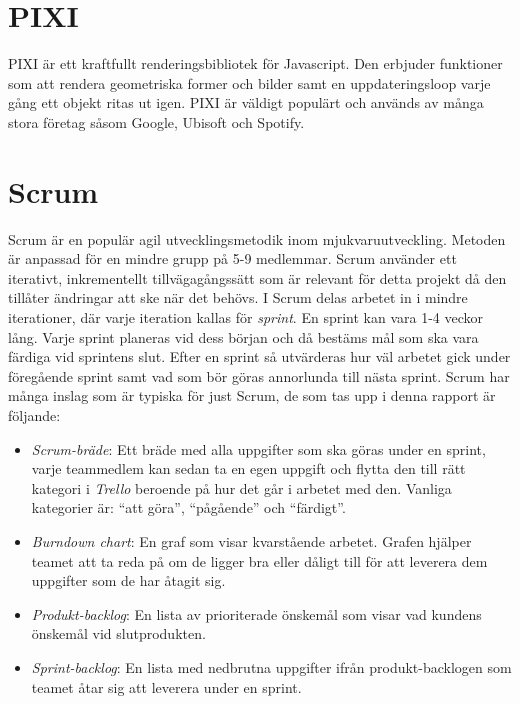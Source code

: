 \section{PIXI}
PIXI är ett kraftfullt renderingsbibliotek för Javascript.\cite{Pixi} Den erbjuder funktioner som att rendera geometriska former och bilder samt en uppdateringsloop varje gång ett objekt ritas ut igen. PIXI är väldigt populärt och används av många stora företag såsom Google, Ubisoft och Spotify. 

\section{Scrum}
Scrum är en populär agil utvecklingsmetodik inom mjukvaruutveckling. Metoden är anpassad för en mindre grupp på 5-9 medlemmar. Scrum använder ett iterativt, inkrementellt tillvägagångssätt som är relevant för detta projekt då den tillåter ändringar att ske när det behövs.\cite{TheScrum} I Scrum delas arbetet in i mindre iterationer, där varje iteration kallas för \textit{sprint}. En sprint kan vara 1-4 veckor lång. Varje sprint planeras vid dess början och då bestäms mål som ska vara färdiga vid sprintens slut. Efter en sprint så utvärderas hur väl arbetet gick under föregående sprint samt vad som bör göras annorlunda till nästa sprint. Scrum har många inslag som är typiska för just Scrum, de som tas upp i denna rapport är följande:

\begin{itemize}
	\item \textit{Scrum-bräde}: Ett bräde med alla uppgifter som ska göras under en sprint, varje teammedlem kan sedan ta en egen uppgift och flytta den till rätt kategori i \textit{Trello} beroende på hur det går i arbetet med den. Vanliga kategorier är: ``att göra'', ``pågående'' och ``färdigt''.
	
	\item \textit{Burndown chart}: En graf som visar kvarstående arbetet. Grafen hjälper teamet att ta reda på om de ligger bra eller dåligt till för att leverera dem uppgifter som de har åtagit sig. 
	
	\item \textit{Produkt-backlog}: En lista av prioriterade önskemål som visar vad kundens önskemål vid slutprodukten.
	
	\item \textit{Sprint-backlog}: En lista med nedbrutna uppgifter ifrån produkt-backlogen som teamet åtar sig att leverera under en sprint. 	
	
\end{itemize}

